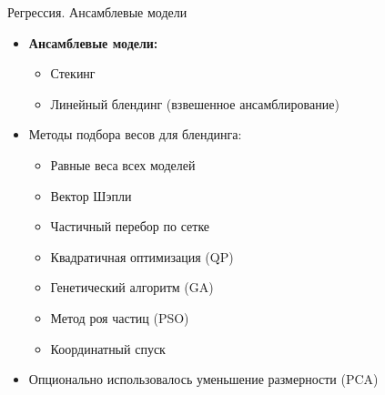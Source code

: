 \documentclass[english,russian, 10pt]{beamer}
\newcommand{\gc}[1]{\gradientcelld{#1}{7}{10.5}{11.8}{low}{mid}{high}{70}}
\begin{document}
\begin{frame}{Регрессия. Ансамблевые модели}
  \begin{itemize}
    \item \textbf{Ансамблевые модели:}
      \begin{itemize}
        \item Стекинг
        \item Линейный блендинг (взвешенное ансамблирование)
      \end{itemize}
    \vspace{0.3em}
    \item Методы подбора весов для блендинга:
      \begin{itemize}
        \item Равные веса всех моделей
        \item Вектор Шэпли
        \item Частичный перебор по сетке
        \item Квадратичная оптимизация (QP)
        \item Генетический алгоритм (GA)
        \item Метод роя частиц (PSO)
        \item Координатный спуск
      \end{itemize}
    \vspace{0.3em} 
    \item Опционально использовалось уменьшение размерности (PCA)
  \end{itemize}
\end{frame}

\renewcommand{\gc}[1]{\gradientcelld{#1}{9}{11.1}{11.8}{low}{mid}{high}{70}}
\end{document}
